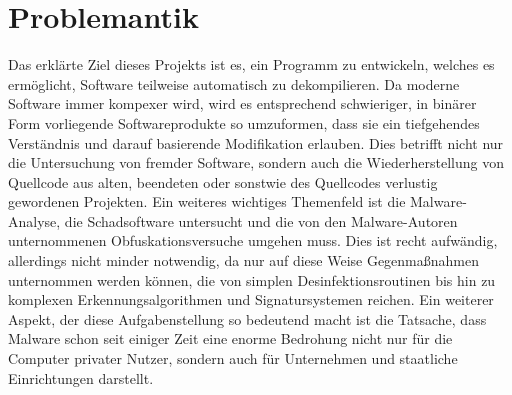 \documentclass[11pt]{article} %
\begin{document}
\section{Problemantik}
Das erklärte Ziel dieses Projekts ist es, ein Programm zu entwickeln, welches
es ermöglicht, Software teilweise automatisch zu dekompilieren. Da moderne Software immer kompexer
wird, wird es entsprechend schwieriger, in binärer Form vorliegende Softwareprodukte so umzuformen,
dass sie ein tiefgehendes Verständnis und darauf basierende Modifikation erlauben.
Dies betrifft nicht nur die Untersuchung von fremder Software, sondern auch die Wiederherstellung
von Quellcode aus alten, beendeten oder sonstwie des Quellcodes verlustig gewordenen Projekten.
Ein weiteres wichtiges Themenfeld ist die Malware-Analyse, die Schadsoftware untersucht und die von
den Malware-Autoren unternommenen Obfuskationsversuche umgehen muss. Dies ist recht aufwändig,
allerdings nicht minder notwendig, da nur auf diese Weise Gegenmaßnahmen unternommen werden können,
die von simplen Desinfektionsroutinen bis hin zu komplexen Erkennungsalgorithmen und Signatursystemen
reichen. Ein weiterer Aspekt, der diese Aufgabenstellung so bedeutend macht ist die Tatsache, dass
Malware schon seit einiger Zeit eine enorme Bedrohung nicht nur für die Computer privater Nutzer, sondern
auch für Unternehmen und staatliche Einrichtungen darstellt.
\end{document}
